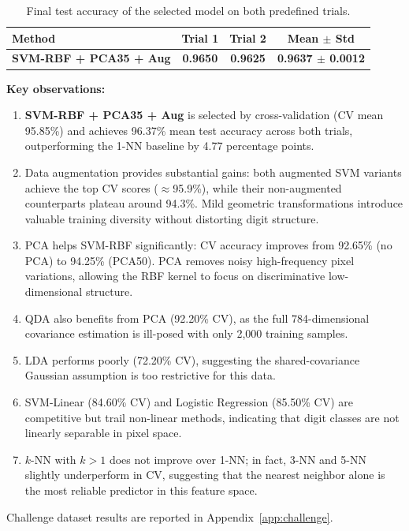 \documentclass[11pt,a4paper,twocolumn]{article}
\begin{document}
\begin{table}[t]
\centering
\caption{Final test accuracy of the selected model on both predefined trials.}
\label{tab:final-results}
\begin{tabular}{@{}lccc@{}}
\toprule
\textbf{Method} & \textbf{Trial 1} & \textbf{Trial 2} & \textbf{Mean $\pm$ Std} \\
\midrule
\textbf{SVM-RBF + PCA35 + Aug} & \textbf{0.9650} & \textbf{0.9625} & \textbf{0.9637 $\pm$ 0.0012} \\
\bottomrule
\end{tabular}
\end{table}

\textbf{Key observations:}
\begin{enumerate}[noitemsep]
    \item \textbf{SVM-RBF + PCA35 + Aug} is selected by cross-validation (CV mean 95.85\%) and achieves 96.37\% mean test accuracy across both trials, outperforming the 1-NN baseline by 4.77 percentage points.
    \item Data augmentation provides substantial gains: both augmented SVM variants achieve the top CV scores ($\approx$95.9\%), while their non-augmented counterparts plateau around 94.3\%. Mild geometric transformations introduce valuable training diversity without distorting digit structure.
    \item PCA helps SVM-RBF significantly: CV accuracy improves from 92.65\% (no PCA) to 94.25\% (PCA50). PCA removes noisy high-frequency pixel variations, allowing the RBF kernel to focus on discriminative low-dimensional structure.
    \item QDA also benefits from PCA (92.20\% CV), as the full 784-dimensional covariance estimation is ill-posed with only 2,000 training samples.
    \item LDA performs poorly (72.20\% CV), suggesting the shared-covariance Gaussian assumption is too restrictive for this data.
    \item SVM-Linear (84.60\% CV) and Logistic Regression (85.50\% CV) are competitive but trail non-linear methods, indicating that digit classes are not linearly separable in pixel space.
    \item $k$-NN with $k > 1$ does not improve over 1-NN; in fact, 3-NN and 5-NN slightly underperform in CV, suggesting that the nearest neighbor alone is the most reliable predictor in this feature space.
\end{enumerate}

Challenge dataset results are reported in Appendix~\ref{app:challenge}.
\end{document}
